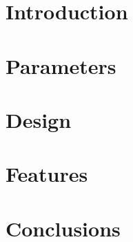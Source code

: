 \documentclass{beamer}
\author{James Bordner}
\date{\today}
\begin{document}



\section{Introduction}

  

\section{Parameters}

  

\section{Design}

  

  

\section{Features}

  

\section{Conclusions}

  
\end{document}
